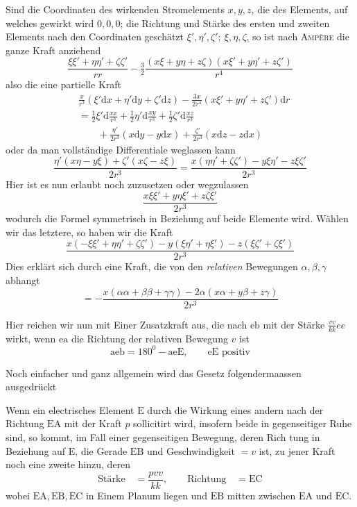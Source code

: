 Sind die Coordinaten des wirkenden Stromelements $x,y,z$, die des Elements, auf welches gewirkt wird $0,0,0$; die Richtung und Stärke des ersten und zweiten Elements nach den Coordinaten geschätzt $\xi',\eta',\zeta';\ \xi,\eta,\zeta$, so ist nach \textsc{Ampère} die ganze Kraft anziehend
\[
\frac{\xi\xi'+\eta\eta'+\zeta\zeta'}{rr}-\tfrac{3}{2}\frac{(x\xi+y\eta+z\zeta)(x\xi'+y\eta'+z\zeta')}{r^4}
\]
also die eine partielle Kraft
\[
\begin{aligned}
&\frac{x}{r^3}(\xi'\mathrm dx+\eta'\mathrm dy+\zeta'\mathrm dz)-\frac{3x}{2r^4}(x\xi'+y\eta'+z\zeta')\mathrm dr\\[5pt]
&=\tfrac{1}{2}\xi'\mathrm d\frac{xx}{r^3}+\tfrac{1}{2}\eta'\mathrm d\frac{xy}{r^3}+\tfrac{1}{2}\zeta'\mathrm d\frac{xz}{r^3}\\
&\qquad+\frac{\eta'}{2r^3}(x\mathrm dy-y\mathrm dx)+\frac{\zeta'}{2r^3}(x\mathrm dz-z\mathrm dx)
\end{aligned}
\]
oder da man vollständige Differentiale weglassen kann
\[
\frac{\eta'(x\eta-y\xi)+\zeta'(x\zeta-z\xi)}{2r^3}=\frac{x(\eta\eta'+\zeta\zeta')-y\xi\eta'-z\xi\zeta'}{2r^3}
\]
Hier ist es nun erlaubt noch zuzusetzen oder wegzulassen
\[
\frac{x\xi\xi'+y\eta\xi'+z\zeta\xi'}{2r^3}
\]
wodurch die Formel symmetrisch in Beziehung auf beide Elemente wird. Wählen wir das letztere, so haben wir die Kraft
\[
\frac{x(-\xi\xi'+\eta\eta'+\zeta\zeta')-y(\xi\eta'+\eta\xi')-z(\xi\zeta'+\zeta\xi')}{2r^3}
\]
Dies erklärt sich durch eine Kraft, die von den \textit{relativen} Bewegungen $\alpha,\beta,\gamma$ abhangt
\[
=-\frac{x(\alpha\alpha+\beta\beta+\gamma\gamma)-2\alpha(x\alpha+y\beta+z\gamma)}{2r^3}
\]

Hier reichen wir nun mit Einer Zusatzkraft aus, die nach $\mathrm{eb}$ mit der Stärke $\frac{vv}{kk}ee$ wirkt, wenn $\mathrm{ea}$ die Richtung der relativen Bewegung $v$ ist
\[
\mathrm{aeb}=180^0-\mathrm{aeE},\qquad\mathrm{eE}\text{ positiv}
\]
\begin{center}\resizebox{.64\textwidth}{!}{}\end{center}

Noch einfacher und ganz allgemein wird das Gesetz folgendermaassen ausgedrückt
\begin{center}\resizebox{.64\textwidth}{!}{}\end{center}

Wenn ein electrisches Element $\mathrm E$ durch die Wirkung eines andern nach der Richtung $\mathrm{EA}$ mit der Kraft $p$ sollicitirt wird, insofern beide in gegenseitiger Ruhe sind, so kommt, im Fall einer gegenseitigen Bewegung, deren Rich%
%
tung in Beziehung auf $\mathrm E$, die Gerade $\mathrm{EB}$ und Geschwindigkeit $=v$ ist, zu jener Kraft noch eine zweite hinzu, deren
\[
\text{Stärke}\quad=\frac{pvv}{kk},\qquad\text{Richtung}\quad=\mathrm{EC}
\]
wobei $\mathrm{EA,EB,EC}$ in Einem Planum liegen und $\mathrm{EB}$ mitten zwischen $\mathrm{EA}$ und $\mathrm{EC}$.

